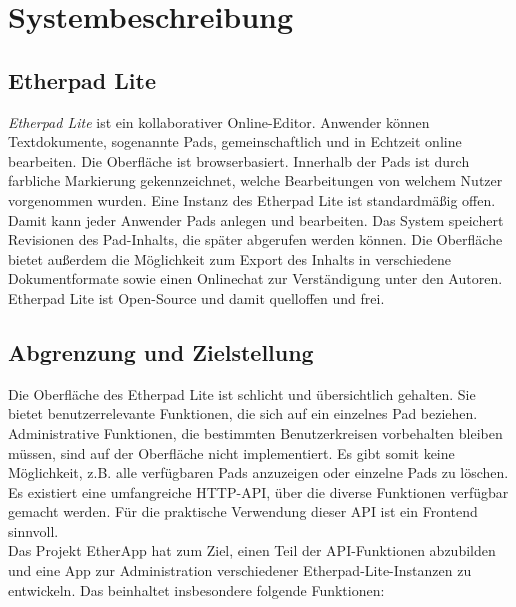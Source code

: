 \section{Systembeschreibung} %
\label{sec:system}

\subsection{Etherpad Lite}
\label{sub:system:etherpad}

\textit{Etherpad Lite} ist ein kollaborativer Online-Editor.
Anwender können Textdokumente, sogenannte Pads, gemeinschaftlich und in Echtzeit online bearbeiten.
Die Oberfläche ist browserbasiert.
Innerhalb der Pads ist durch farbliche Markierung gekennzeichnet, welche Bearbeitungen von welchem Nutzer vorgenommen wurden.
Eine Instanz des Etherpad Lite ist standardmäßig offen.
Damit kann jeder Anwender Pads anlegen und bearbeiten.
Das System speichert Revisionen des Pad-Inhalts, die später abgerufen werden können.
Die Oberfläche bietet außerdem die Möglichkeit zum Export des Inhalts in verschiedene Dokumentformate sowie einen Onlinechat zur Verständigung unter den Autoren.\\
Etherpad Lite ist Open-Source und damit quelloffen und frei.

\subsection{Abgrenzung und Zielstellung}
Die Oberfläche des Etherpad Lite ist schlicht und übersichtlich gehalten.
Sie bietet benutzerrelevante Funktionen, die sich auf ein einzelnes Pad beziehen.
Administrative Funktionen, die bestimmten Benutzerkreisen vorbehalten bleiben müssen, sind auf der Oberfläche nicht implementiert.
Es gibt somit keine Möglichkeit, z.B. alle verfügbaren Pads anzuzeigen oder einzelne Pads zu löschen.\\
Es existiert eine umfangreiche HTTP-API, über die diverse Funktionen verfügbar gemacht werden.
Für die praktische Verwendung dieser API ist ein Frontend sinnvoll.\\
Das Projekt EtherApp hat zum Ziel, einen Teil der API-Funktionen abzubilden und eine App zur Administration verschiedener Etherpad-Lite-Instanzen zu entwickeln.
Das beinhaltet insbesondere folgende Funktionen:

